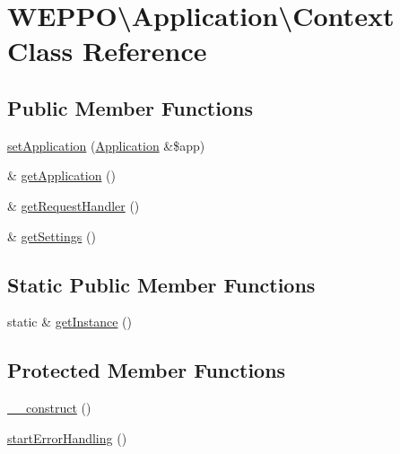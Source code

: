\hypertarget{classWEPPO_1_1Application_1_1Context}{}\section{W\+E\+P\+PO\textbackslash{}Application\textbackslash{}Context Class Reference}
\label{classWEPPO_1_1Application_1_1Context}
\subsection*{Public Member Functions}
\begin{DoxyCompactItemize}
\item 
\hyperlink{classWEPPO_1_1Application_1_1Context_a6ec237312504d90840c2d904ca10bc8d}{set\+Application} (\hyperlink{classWEPPO_1_1Application_1_1Application}{Application} \&\$app)
\item 
\& \hyperlink{classWEPPO_1_1Application_1_1Context_a952046f64f051a5b260a2bdb3236d2e1}{get\+Application} ()
\item 
\& \hyperlink{classWEPPO_1_1Application_1_1Context_ac1cf041262fd633d62ed72d6751dd86d}{get\+Request\+Handler} ()
\item 
\& \hyperlink{classWEPPO_1_1Application_1_1Context_a40a4db69d35c841272c08d625312b24f}{get\+Settings} ()
\end{DoxyCompactItemize}
\subsection*{Static Public Member Functions}
\begin{DoxyCompactItemize}
\item 
static \& \hyperlink{classWEPPO_1_1Application_1_1Context_a2937ef552f843d3fffe8097224f2f49d}{get\+Instance} ()
\end{DoxyCompactItemize}
\subsection*{Protected Member Functions}
\begin{DoxyCompactItemize}
\item 
\hyperlink{classWEPPO_1_1Application_1_1Context_a944300530c8f90dc62b2dbf329d3cb9d}{\+\_\+\+\_\+construct} ()
\item 
\hyperlink{classWEPPO_1_1Application_1_1Context_a29b3703353629ce85073e8e86f815473}{start\+Error\+Handling} ()
\end{DoxyCompactItemize}
